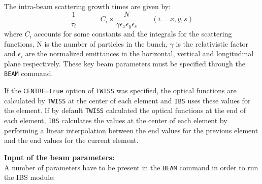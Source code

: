 The intra-beam scattering growth times are given by:
\[
 \frac{1}{\tau_i} \quad = \quad C_i \times \frac{N}{\gamma \epsilon_x
   \epsilon_y \epsilon_s} \qquad (i = x, y, s) 
\]
where $C_i$ accounts for some constants and the integrals for the
scattering functions, N is the number of particles in the bunch,
$\gamma$ is the relativistic factor and $\epsilon_i$ are the normalized
emittances in the horizontal, vertical and longitudinal plane
respectively. These key beam parameters must be specified through the
\texttt{BEAM} command. 

If the \texttt{CENTRE=true} option of \texttt{TWISS} was specified,
the optical functions are calculated by \texttt{TWISS} at the center of 
each element and \texttt{IBS} uses these values for the element. 
If by default \texttt{TWISS} calculated the optical functions at the end
of each element, \texttt{IBS} calculates the values at the center of
each element by performing a linear interpolation between the end values
for the previous element and the end values for the current element.

  
{\bf Input of the beam parameters:}\\
A number of parameters have to be present in the  \texttt{BEAM} command
in order to run the IBS module: 

